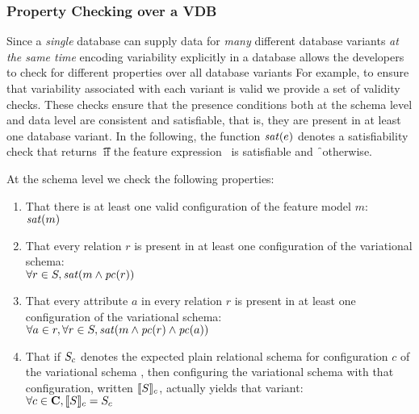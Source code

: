\subsubsection{Property Checking over a VDB}
\label{sec:vdb-props}


Since
a \emph{single} database can supply data for \emph{many} different
database variants \emph{at the same time}
encoding variability explicitly in a database  allows the developers to 
check for different properties over all database variants
For example, to ensure that variability associated with each variant is 
valid we provide a set of validity checks.
These checks ensure that the presence conditions both at the schema level and
data level are consistent and satisfiable, that is, they are present in at
least one database variant. In the following, the function $\sat\dimMeta$
denotes a satisfiability check that returns \t\ if the feature expression
\dimMeta\ is satisfiable and \f\ otherwise.


At the schema level we check the following properties:
%
\begin{enumerate}
%
\item That there is at least one valid configuration of the feature model $m$:\\
%
$\sat\fModel$
%
\item That every relation $r$ is present in at least one configuration of the
variational schema:\\
%
$\forall\vRel\in\vSch, \sat{\fModel\wedge\getPC\vRel}$
%
\item That every attribute $a$ in every relation $r$ is present in at least one
configuration of the variational schema:\\
%
$\forall\vAtt\in\vRel, \forall\vRel\in\vSch,
\sat{\fModel\wedge\getPC\vRel\wedge\getPC\vAtt}$
%
\item That if $\vSch_\config$ denotes the expected plain relational schema for
configuration $c$ of the variational schema \vSch, then configuring the
variational schema with that configuration, written $\sem[\config]{\vSch}$,
actually yields that variant:\\
%
$\forall\config\in\confSet, \sem[\config]{\vSch} = \vSch_\config$
%
\end{enumerate}


